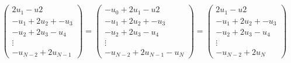\begin{align*}
    \begin{pmatrix}
        2u_1 - u2 \\
        -u_1 + 2u_2 + -u_3 \\
        -u_2 + 2 u_3 - u_4 \\
        \vdots \\
        -u_{N-2} + 2 u_{N - 1}
    \end{pmatrix}
    =
    \begin{pmatrix}
        -u_0 + 2u_1 - u2 \\
        -u_1 + 2u_2 + -u_3 \\
        -u_2 + 2 u_3 - u_4 \\
        \vdots \\
        -u_{N-2} + 2 u_{N - 1} - u_N
    \end{pmatrix}
    =
    \begin{pmatrix}
        2u_1 - u2 \\
        -u_1 + 2u_2 + -u_3 \\
        -u_2 + 2 u_3 - u_4 \\
        \vdots \\
        -u_{N-2} + 2 u_N
    \end{pmatrix}
\end{align*}
